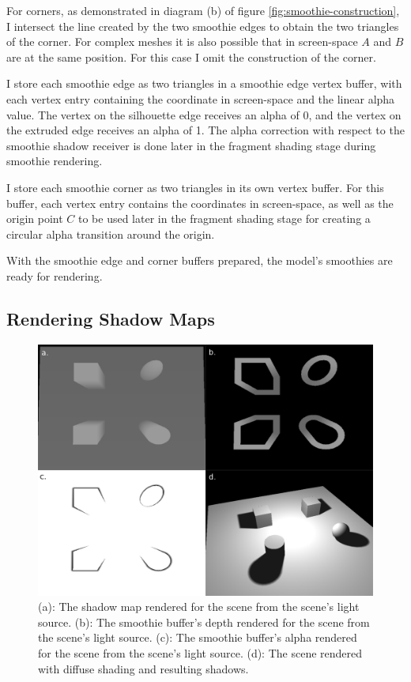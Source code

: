 \documentclass[sigconf]{acmart}
\begin{document}
For corners, as demonstrated in diagram (b) of figure \ref{fig:smoothie-construction}, I intersect the line created by the two smoothie edges to obtain the two triangles of the corner. For complex meshes it is also possible that in screen-space $A$ and $B$ are at the same position. For this case I omit the construction of the corner.

I store each smoothie edge as two triangles in a smoothie edge vertex buffer, with each vertex entry containing the coordinate in screen-space and the linear alpha value. The vertex on the silhouette edge receives an alpha of 0, and the vertex on the extruded edge receives an alpha of 1. The alpha correction with respect to the smoothie shadow receiver is done later in the fragment shading stage during smoothie rendering.

I store each smoothie corner as two triangles in its own vertex buffer. For this buffer, each vertex entry contains the coordinates in screen-space, as well as the origin point $C$ to be used later in the fragment shading stage for creating a circular alpha transition around the origin. 

With the smoothie edge and corner buffers prepared, the model's smoothies are ready for rendering.

\subsection{Rendering Shadow Maps}

\begin{figure}[t]
    \includegraphics[width=\linewidth]{reportfiles/render-phases}
    \caption{(a): The shadow map rendered for the scene from the scene's light source. (b): The smoothie buffer's depth rendered for the scene from the scene's light source. (c): The smoothie buffer's alpha rendered for the scene from the scene's light source. (d): The scene rendered with diffuse shading and resulting shadows.}
    \label{fig:render-phases}
\end{figure}
\end{document}
